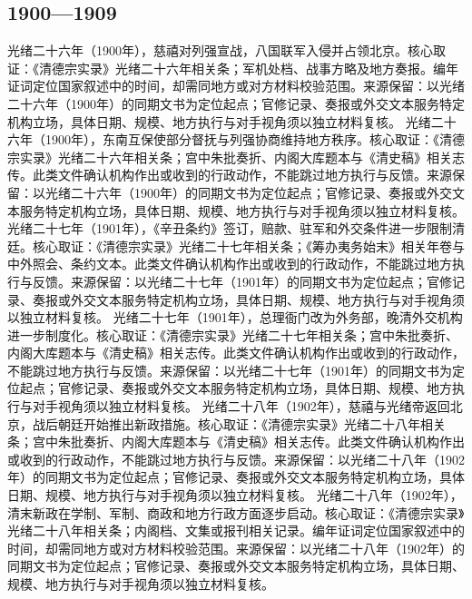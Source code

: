 \subsection{1900—1909}
光绪二十六年（1900年），慈禧对列强宣战，八国联军入侵并占领北京。核心取证：《清德宗实录》光绪二十六年相关条；军机处档、战事方略及地方奏报。编年证词定位国家叙述中的时间，却需同地方或对方材料校验范围。来源保留：以光绪二十六年（1900年）的同期文书为定位起点；官修记录、奏报或外交文本服务特定机构立场，具体日期、规模、地方执行与对手视角须以独立材料复核。
光绪二十六年（1900年），东南互保使部分督抚与列强协商维持地方秩序。核心取证：《清德宗实录》光绪二十六年相关条；宫中朱批奏折、内阁大库题本与《清史稿》相关志传。此类文件确认机构作出或收到的行政动作，不能跳过地方执行与反馈。来源保留：以光绪二十六年（1900年）的同期文书为定位起点；官修记录、奏报或外交文本服务特定机构立场，具体日期、规模、地方执行与对手视角须以独立材料复核。
光绪二十七年（1901年），《辛丑条约》签订，赔款、驻军和外交条件进一步限制清廷。核心取证：《清德宗实录》光绪二十七年相关条；《筹办夷务始末》相关年卷与中外照会、条约文本。此类文件确认机构作出或收到的行政动作，不能跳过地方执行与反馈。来源保留：以光绪二十七年（1901年）的同期文书为定位起点；官修记录、奏报或外交文本服务特定机构立场，具体日期、规模、地方执行与对手视角须以独立材料复核。
光绪二十七年（1901年），总理衙门改为外务部，晚清外交机构进一步制度化。核心取证：《清德宗实录》光绪二十七年相关条；宫中朱批奏折、内阁大库题本与《清史稿》相关志传。此类文件确认机构作出或收到的行政动作，不能跳过地方执行与反馈。来源保留：以光绪二十七年（1901年）的同期文书为定位起点；官修记录、奏报或外交文本服务特定机构立场，具体日期、规模、地方执行与对手视角须以独立材料复核。
光绪二十八年（1902年），慈禧与光绪帝返回北京，战后朝廷开始推出新政措施。核心取证：《清德宗实录》光绪二十八年相关条；宫中朱批奏折、内阁大库题本与《清史稿》相关志传。此类文件确认机构作出或收到的行政动作，不能跳过地方执行与反馈。来源保留：以光绪二十八年（1902年）的同期文书为定位起点；官修记录、奏报或外交文本服务特定机构立场，具体日期、规模、地方执行与对手视角须以独立材料复核。
光绪二十八年（1902年），清末新政在学制、军制、商政和地方行政方面逐步启动。核心取证：《清德宗实录》光绪二十八年相关条；内阁档、文集或报刊相关记录。编年证词定位国家叙述中的时间，却需同地方或对方材料校验范围。来源保留：以光绪二十八年（1902年）的同期文书为定位起点；官修记录、奏报或外交文本服务特定机构立场，具体日期、规模、地方执行与对手视角须以独立材料复核。
